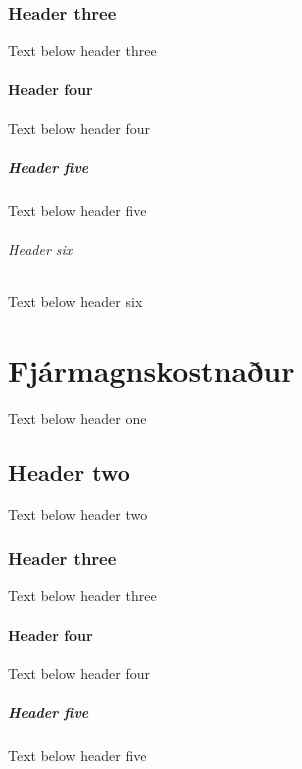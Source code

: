 \documentclass[a4paper,10pt,icelandic]{sphinxmanual}
\begin{document}
\subsection{Header three}
\label{\detokenize{kennitolur/index:header-three}}
\sphinxAtStartPar
Text below header three


\subsubsection{Header four}
\label{\detokenize{kennitolur/index:header-four}}
\sphinxAtStartPar
Text below header four


\paragraph{Header five}
\label{\detokenize{kennitolur/index:header-five}}
\sphinxAtStartPar
Text below header five


\subparagraph{Header six}
\label{\detokenize{kennitolur/index:header-six}}
\sphinxAtStartPar
Text below header six

\sphinxstepscope


\chapter{Fjármagnskostnaður}
\label{\detokenize{fjarmagnskostnadur/index:fjarmagnskostnaur}}\label{\detokenize{fjarmagnskostnadur/index::doc}}
\sphinxAtStartPar
Text below header one


\section{Header two}
\label{\detokenize{fjarmagnskostnadur/index:header-two}}
\sphinxAtStartPar
Text below header two


\subsection{Header three}
\label{\detokenize{fjarmagnskostnadur/index:header-three}}
\sphinxAtStartPar
Text below header three


\subsubsection{Header four}
\label{\detokenize{fjarmagnskostnadur/index:header-four}}
\sphinxAtStartPar
Text below header four


\paragraph{Header five}
\label{\detokenize{fjarmagnskostnadur/index:header-five}}
\sphinxAtStartPar
Text below header five
\end{document}
